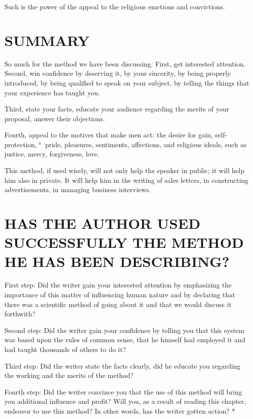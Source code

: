 \documentclass[10pt]{article}
\begin{document}
Such is the power of the appeal to the religious emctions and convictions.

\section*{SUMMARY}
So much for the method we have been discussing. First, get interested attention.\\
Second, win confidence by deserving it, by your sincerity, by being properly introduced, by being qualified to speak on your subject, by telling the things that your experience has taught you.

Third, state your facts, educate your audience regarding the merits of your proposal, answer their objections.

Fourth, appeal to the motives that make men act: the desire for gain, self-protection, ${ }^{\text {s }}$ pride, pleasures, sentiments, affections, and religious ideals, such as justice, mercy, forgiveness, love.

This method, if used wisely, will not only help the speaker in public; it will help him also in private. It will help him in the writing of sales letters, in constructing advertisements, in managing business interviews.

\section*{HAS THE AUTHOR USED SUCCESSFULLY THE METHOD HE HAS BEEN DESCRIBING?}
First step: Did the writer gain your interested attention by emphasizing the importance of this matter of influencing human nature and by declaring that there was a scientific method of going about it and that we would discuss it forthwith?

Second step: Did the writer gain your confidence by telling you that this system was based upon the rules of common sense, that he himself had employed it and had taught thousands of others to do it?

Third step: Did the writer state the facts clearly, did he educate you regarding the working and the merits of the method?

Fourth step: Did the writer convince you that the use of this method will bring you additional influence and profit? Will you, as a result of reading this chapter, endeavor to use this method? In other words, has the writer gotten action? *
\end{document}
